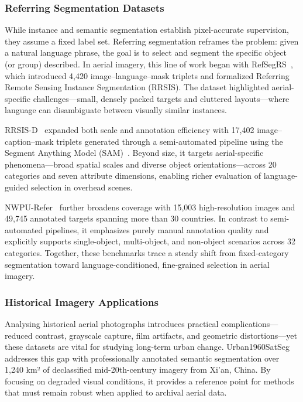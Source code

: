 \subsubsection{Referring Segmentation Datasets}

While instance and semantic segmentation establish pixel-accurate supervision, they assume a fixed label set. Referring segmentation reframes the problem: given a natural language phrase, the goal is to select and segment the specific object (or group) described. In aerial imagery, this line of work began with RefSegRS~\cite{yuan2023rrsis}, which introduced 4,420 image–language–mask triplets and formalized Referring Remote Sensing Instance Segmentation (RRSIS). The dataset highlighted aerial-specific challenges—small, densely packed targets and cluttered layouts—where language can disambiguate between visually similar instances.

RRSIS-D~\cite{liu2024rotated} expanded both scale and annotation efficiency with 17,402 image–caption–mask triplets generated through a semi-automated pipeline using the Segment Anything Model (SAM)~\cite{sam}. Beyond size, it targets aerial-specific phenomena—broad spatial scales and diverse object orientations—across 20 categories and seven attribute dimensions, enabling richer evaluation of language-guided selection in overhead scenes.

NWPU-Refer~\cite{yang2024large} further broadens coverage with 15,003 high-resolution images and 49,745 annotated targets spanning more than 30 countries. In contrast to semi-automated pipelines, it emphasizes purely manual annotation quality and explicitly supports single-object, multi-object, and non-object scenarios across 32 categories. Together, these benchmarks trace a steady shift from fixed-category segmentation toward language-conditioned, fine-grained selection in aerial imagery.

\subsubsection{Historical Imagery Applications}

Analysing historical aerial photographs introduces practical complications—reduced contrast, grayscale capture, film artifacts, and geometric distortions—yet these datasets are vital for studying long-term urban change. Urban1960SatSeg~\cite{hao2025urban1960satseg} addresses this gap with professionally annotated semantic segmentation over 1,240 km² of declassified mid-20th-century imagery from Xi'an, China. By focusing on degraded visual conditions, it provides a reference point for methods that must remain robust when applied to archival aerial data.


